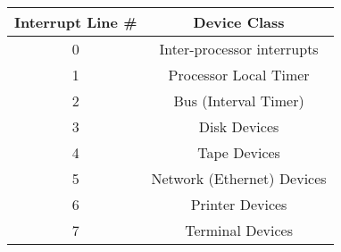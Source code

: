 \begin{center}
	\begin{tabular}{|c|c|}
		\hline
		Interrupt Line \# & Device Class\\
		\hline
		\hline
		\cellcolor{gray}0 & \cellcolor{gray}Inter-processor interrupts\\
		\hline
		\cellcolor{gray}1 & \cellcolor{gray}Processor Local Timer\\
		\hline
		2 & Bus (Interval Timer)\\
		\hline
		3 & Disk Devices\\
		\hline
		4 & Tape Devices\\
		\hline
		5 & Network (Ethernet) Devices\\
		\hline
		6 & Printer Devices\\
		\hline
		7 & Terminal Devices\\
		\hline
	\end{tabular}
\end{center}

